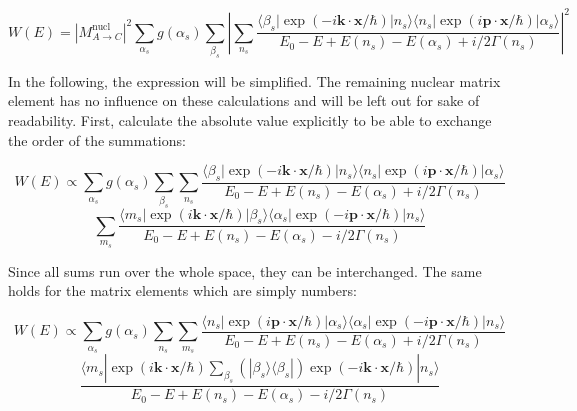 \documentclass{article}
\begin{document}
\begin{equation}
\label{absorption_simplification_1}
	W(E) =  \left| M^\mathrm{nucl}_{A \to C} \right|^2 \sum_{\alpha_s} g(\alpha_s) \sum_{\beta_s} \left| \sum_{n_s} \frac{ \langle \beta_s | \exp{\left( - i \mathbf{k} \cdot \mathbf{x} / \hbar \right)} | n_s \rangle \langle n_s | \exp{\left( i \mathbf{p} \cdot \mathbf{x} / \hbar \right)} | \alpha_s \rangle  }{E_0 - E + E(n_s) - E(\alpha_s) + i/2 \Gamma(n_s)} \right| ^2
\end{equation}

In the following, the expression will be simplified. The remaining nuclear matrix element has no influence on these calculations and will be left out for sake of readability.
First, calculate the absolute value explicitly to be able to exchange the order of the summations:

\begin{equation}
\label{absorption_simplification_2}
	W (E) \propto \sum_{\alpha_s} g(\alpha_s) \sum_{\beta_s} \sum_{n_s} \frac{ \langle \beta_s | \exp{\left( - i \mathbf{k} \cdot \mathbf{x} / \hbar \right)} | n_s \rangle \langle n_s | \exp{\left( i \mathbf{p} \cdot \mathbf{x} / \hbar \right)} | \alpha_s \rangle  }{E_0 - E + E(n_s) - E(\alpha_s) + i/2 \Gamma(n_s)} 
\end{equation}	
\begin{equation*}
\sum_{m_s} \frac{ \langle m_s | \exp{\left( i \mathbf{k} \cdot \mathbf{x} / \hbar \right)} | \beta_s \rangle \langle \alpha_s | \exp{\left(  - i \mathbf{p} \cdot \mathbf{x} / \hbar \right)} | n_s \rangle  }{E_0 - E + E(n_s) - E(\alpha_s) - i/2 \Gamma(n_s)}
\end{equation*}

Since all sums run over the whole space, they can be interchanged. 
The same holds for the matrix elements which are simply numbers:

\begin{equation}
\label{absorption_simplification_3}
	W (E) \propto \sum_{\alpha_s} g(\alpha_s) \sum_{n_s} \sum_{m_s} \frac{  \langle n_s | \exp{\left( i \mathbf{p} \cdot \mathbf{x} / \hbar \right)} | \alpha_s \rangle \langle \alpha_s | \exp{\left(  - i \mathbf{p} \cdot \mathbf{x} / \hbar \right)} | n_s \rangle  }{E_0 - E + E(n_s) - E(\alpha_s) + i/2 \Gamma(n_s)} 
\end{equation}	
\begin{equation*}
	\frac{ \langle m_s | \exp{\left( i \mathbf{k} \cdot \mathbf{x} / \hbar \right)} \sum_{\beta_s} \left( | \beta_s \rangle \langle \beta_s | \right) \exp{\left( - i \mathbf{k} \cdot \mathbf{x} / \hbar \right)} | n_s \rangle }{E_0 - E + E(n_s) - E(\alpha_s) - i/2 \Gamma(n_s)}
\end{equation*}
\end{document}
